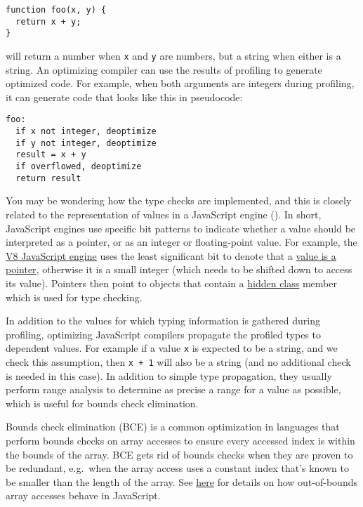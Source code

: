 \documentclass[
  a4paper,
]{report}
\begin{document}
\begin{verbatim}
function foo(x, y) {
  return x + y;
}
\end{verbatim}

will return a number when \texttt{x} and \texttt{y} are numbers, but a
string when either is a string. An optimizing compiler can use the
results of profiling to generate optimized code. For example, when both
arguments are integers during profiling, it can generate code that looks
like this in pseudocode:

\begin{verbatim}
foo:
  if x not integer, deoptimize
  if y not integer, deoptimize
  result = x + y
  if overflowed, deoptimize
  return result
\end{verbatim}

You may be wondering how the type checks are implemented, and this is
closely related to the representation of values in a JavaScript engine
(). In short, JavaScript engines use
specific bit patterns to indicate whether a value should be interpreted
as a pointer, or as an integer or floating-point value. For example, the
\href{https://v8.dev/}{V8 JavaScript engine} uses the least significant
bit to denote that a
\href{https://v8.dev/blog/pointer-compression\#value-tagging-in-v8}{value
is a pointer}, otherwise it is a small integer (which needs to be
shifted down to access its value). Pointers then point to objects that
contain a \href{https://v8.dev/docs/hidden-classes}{hidden class} member
which is used for type checking.

In addition to the values for which typing information is gathered
during profiling, optimizing JavaScript compilers propagate the profiled
types to dependent values. For example if a value \texttt{x} is expected
to be a string, and we check this assumption, then \texttt{x\ +\ 1} will
also be a string (and no additional check is needed in this case). In
addition to simple type propagation, they usually perform range
analysis to determine as precise a range for a
value as possible, which is useful for bounds check
elimination.

Bounds check elimination (BCE) is a
common optimization in languages that perform bounds checks on array
accesses to ensure every accessed index is within the bounds of the
array. BCE gets rid of bounds checks when they are proven to be
redundant, e.g.~when the array access uses a constant index that's known
to be smaller than the length of the array. See
\href{https://developer.mozilla.org/en-US/docs/Web/JavaScript/Reference/Global_Objects/Array/length}{here}
for details on how out-of-bounds array accesses behave in JavaScript.
\end{document}
